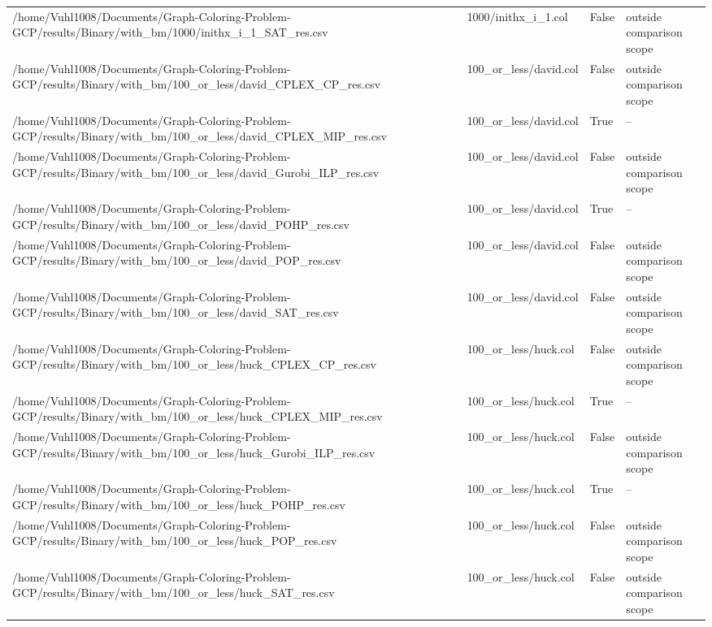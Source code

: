 \begin{table}[htbp]
\begin{tabular}{llll}
/home/Vuhl1008/Documents/Graph-Coloring-Problem-GCP/results/Binary/with\_bm/1000/inithx\_i\_1\_SAT\_res.csv & 1000/inithx\_i\_1.col & False & outside comparison scope \\
/home/Vuhl1008/Documents/Graph-Coloring-Problem-GCP/results/Binary/with\_bm/100\_or\_less/david\_CPLEX\_CP\_res.csv & 100\_or\_less/david.col & False & outside comparison scope \\
/home/Vuhl1008/Documents/Graph-Coloring-Problem-GCP/results/Binary/with\_bm/100\_or\_less/david\_CPLEX\_MIP\_res.csv & 100\_or\_less/david.col & True & -- \\
/home/Vuhl1008/Documents/Graph-Coloring-Problem-GCP/results/Binary/with\_bm/100\_or\_less/david\_Gurobi\_ILP\_res.csv & 100\_or\_less/david.col & False & outside comparison scope \\
/home/Vuhl1008/Documents/Graph-Coloring-Problem-GCP/results/Binary/with\_bm/100\_or\_less/david\_POHP\_res.csv & 100\_or\_less/david.col & True & -- \\
/home/Vuhl1008/Documents/Graph-Coloring-Problem-GCP/results/Binary/with\_bm/100\_or\_less/david\_POP\_res.csv & 100\_or\_less/david.col & False & outside comparison scope \\
/home/Vuhl1008/Documents/Graph-Coloring-Problem-GCP/results/Binary/with\_bm/100\_or\_less/david\_SAT\_res.csv & 100\_or\_less/david.col & False & outside comparison scope \\
/home/Vuhl1008/Documents/Graph-Coloring-Problem-GCP/results/Binary/with\_bm/100\_or\_less/huck\_CPLEX\_CP\_res.csv & 100\_or\_less/huck.col & False & outside comparison scope \\
/home/Vuhl1008/Documents/Graph-Coloring-Problem-GCP/results/Binary/with\_bm/100\_or\_less/huck\_CPLEX\_MIP\_res.csv & 100\_or\_less/huck.col & True & -- \\
/home/Vuhl1008/Documents/Graph-Coloring-Problem-GCP/results/Binary/with\_bm/100\_or\_less/huck\_Gurobi\_ILP\_res.csv & 100\_or\_less/huck.col & False & outside comparison scope \\
/home/Vuhl1008/Documents/Graph-Coloring-Problem-GCP/results/Binary/with\_bm/100\_or\_less/huck\_POHP\_res.csv & 100\_or\_less/huck.col & True & -- \\
/home/Vuhl1008/Documents/Graph-Coloring-Problem-GCP/results/Binary/with\_bm/100\_or\_less/huck\_POP\_res.csv & 100\_or\_less/huck.col & False & outside comparison scope \\
/home/Vuhl1008/Documents/Graph-Coloring-Problem-GCP/results/Binary/with\_bm/100\_or\_less/huck\_SAT\_res.csv & 100\_or\_less/huck.col & False & outside comparison scope \\

\end{tabular}
\end{table}
